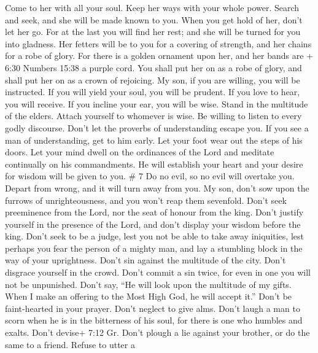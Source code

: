  Come to her with all your soul. Keep her ways with your
whole power.  Search and seek, and she will be made known
to you. When you get hold of her, don't let her go.  For at
the last you will find her rest; and she will be turned for you into
gladness.  Her fetters will be to you for a covering of
strength, and her chains for a robe of glory.  For there is
a golden ornament upon her, and her bands are + 6:30 Numbers 15:38 a
purple cord.  You shall put her on as a robe of glory, and
shall put her on as a crown of rejoicing.  My son, if you
are willing, you will be instructed. If you will yield your soul, you
will be prudent.  If you love to hear, you will receive. If
you incline your ear, you will be wise.  Stand in the
multitude of the elders. Attach yourself to whomever is wise.
 Be willing to listen to every godly discourse. Don't let
the proverbs of understanding escape you.  If you see a man
of understanding, get to him early. Let your foot wear out the steps of
his doors.  Let your mind dwell on the ordinances of the
Lord and meditate continually on his commandments. He will establish
your heart and your desire for wisdom will be given to you. \# 7
 Do no evil, so no evil will overtake you. 
Depart from wrong, and it will turn away from you.  My son,
don't sow upon the furrows of unrighteousness, and you won't reap them
sevenfold.  Don't seek preeminence from the Lord, nor the
seat of honour from the king.  Don't justify yourself in the
presence of the Lord, and don't display your wisdom before the king.
 Don't seek to be a judge, lest you not be able to take away
iniquities, lest perhaps you fear the person of a mighty man, and lay a
stumbling block in the way of your uprightness.  Don't sin
against the multitude of the city. Don't disgrace yourself in the crowd.
 Don't commit a sin twice, for even in one you will not be
unpunished.  Don't say, ``He will look upon the multitude of
my gifts. When I make an offering to the Most High God, he will accept
it.''  Don't be faint-hearted in your prayer. Don't neglect
to give alms.  Don't laugh a man to scorn when he is in the
bitterness of his soul, for there is one who humbles and exalts.
 Don't devise+ 7:12 Gr. Don't plough a lie against your
brother, or do the same to a friend.  Refuse to utter a
